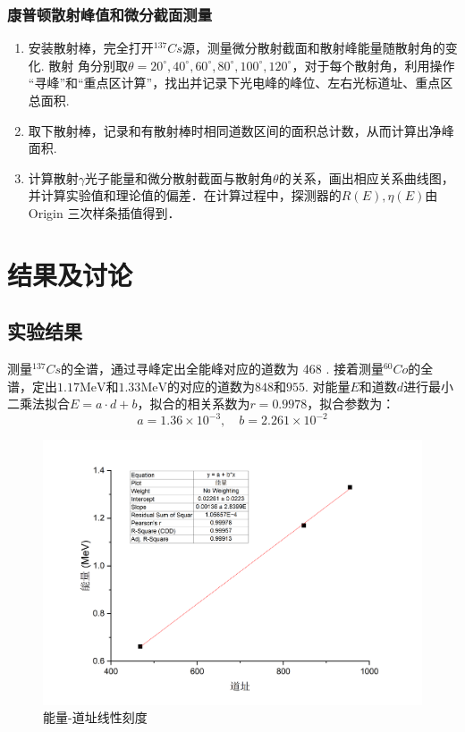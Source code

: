 \documentclass[font=default]{mpltx}
\begin{document}
  \subsubsection{康普顿散射峰值和微分截面测量}
    \begin{enumerate}
      \item 安装散射棒，完全打开${^{137}Cs}$源，测量微分散射截面和散射峰能量随散射角的变化. 散射
      角分别取$\theta = 20^\circ,40^\circ ,60^\circ ,80^\circ ,100^\circ ,120^\circ $，对于每个散射角，利用操作
      “寻峰”和“重点区计算”，找出并记录下光电峰的峰位、左右光标道址、重点区总面积. 
      \item 取下散射棒，记录和有散射棒时相同道数区间的面积总计数，从而计算出净峰面积.
      \item 计算散射$\gamma$光子能量和微分散射截面与散射角$\theta$的关系，画出相应关系曲线图，
      并计算实验值和理论值的偏差．在计算过程中，探测器的$R(E), \eta(E)$由 Origin 三次样条插值得到．
    \end{enumerate}

\section{结果及讨论}

  \subsection{实验结果}

    测量${^{137}Cs}$的全谱，通过寻峰定出全能峰对应的道数为 468 . 接着测量${^{60}Co}$的全谱，定出$1.17\text{MeV}$和$1.33\text{MeV}$的对应的道数为$848$和$955$.
    对能量$E$和道数$d$进行最小二乘法拟合$E = a \cdot d + b $，拟合的相关系数为$r = 0.9978$，拟合参数为：
    $$a = 1.36 \times 10^{-3}, \quad b = 2.261 \times 10^{-2}$$

    \begin{figure}[htbp]
      \centering
      \includegraphics[width=0.85\linewidth]{fig/nihe.png}
      \caption{能量-道址线性刻度}
      \label{fig:nihe}
    \end{figure}
\end{document}
